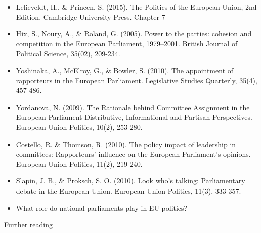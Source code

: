 \begin{itemize}
	\item Lelieveldt, H., \& Princen, S. (2015). The Politics of the European Union, 2nd Edition. Cambridge University Press. Chapter 7
	\item Hix, S., Noury, A., \& Roland, G. (2005). Power to the parties: cohesion and competition in the European Parliament, 1979–2001. British Journal of Political Science, 35(02), 209-234.
	\item Yoshinaka, A., McElroy, G., \& Bowler, S. (2010). The appointment of rapporteurs in the European Parliament. Legislative Studies Quarterly, 35(4), 457-486.
	\item Yordanova, N. (2009). The Rationale behind Committee Assignment in the European Parliament Distributive, Informational and Partisan Perspectives. European Union Politics, 10(2), 253-280.
	\item Costello, R. \& Thomson, R. (2010). The policy impact of leadership in committees: Rapporteurs’ influence on the European Parliament’s opinions. European Union Politics, 11(2), 219-240.
	\item Slapin, J. B., \& Proksch, S. O. (2010). Look who’s talking: Parliamentary debate in the European Union. European Union Politics, 11(3), 333-357.
	\item What role do national parliaments play in EU politics?
\end{itemize}

\noindent Further reading

